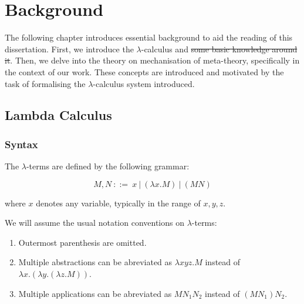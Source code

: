 \chapter{Background}
\label{c:background}


The following chapter introduces essential background to aid the reading of this dissertation.
First, we introduce the $\lambda$-calculus and \sout{some basic knowledge around it}.
Then, we delve into the theory on mechanisation of meta-theory, specifically in the context of our work.
These concepts are introduced and motivated by the task of formalising the $\lambda$-calculus system introduced.

\section{Lambda Calculus}

\subsection{Syntax}

\cite{Hindley1997} \cite{Barendregt1987}

\begin{definition}
  The $\lambda$-terms are defined by the following grammar:

  \[ M, N \ ::= \ x \ | \ (\lambda x . M) \ | \ (M N) \]

  where $x$ denotes any variable, typically in the range of $x, y, z$.
\end{definition}

\begin{notation}
  We will assume the usual notation conventions on $\lambda$-terms:

  \begin{enumerate}
  \item Outermost parenthesis are omitted.
  \item Multiple abstractions can be abreviated as $\lambda x y z . M$ instead of  $\lambda x . (\lambda y . (\lambda z . M))$.
  \item Multiple applications can be abreviated as $M N_1 N_2$ instead of $(M N_1) N_2$.
  \end{enumerate}
\end{notation}

